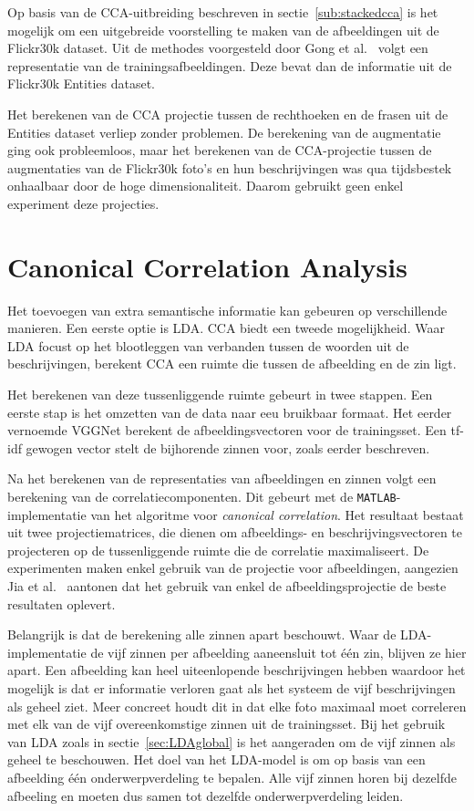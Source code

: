 Op basis van de CCA-uitbreiding beschreven in sectie~\ref{sub:stackedcca} is het mogelijk om een uitgebreide voorstelling te maken van de afbeeldingen uit de Flickr30k dataset. Uit de methodes voorgesteld door Gong et al.~\cite{Gong2014} volgt een representatie van de trainingsafbeeldingen. Deze bevat dan de informatie uit de Flickr30k Entities dataset.

Het berekenen van de CCA projectie tussen de rechthoeken en de frasen uit de Entities dataset verliep zonder problemen. De berekening van de augmentatie ging ook probleemloos, maar het berekenen van de CCA-projectie tussen de augmentaties van de Flickr30k foto's en hun beschrijvingen was qua tijdsbestek onhaalbaar door de hoge dimensionaliteit. Daarom gebruikt geen enkel experiment deze projecties. 

\section{Canonical Correlation Analysis}
Het toevoegen van extra semantische informatie kan gebeuren op verschillende manieren. Een eerste optie is LDA. CCA biedt een tweede mogelijkheid. Waar LDA focust op het blootleggen van verbanden tussen de woorden uit de beschrijvingen, berekent CCA een ruimte die tussen de afbeelding en de zin ligt.

Het berekenen van deze tussenliggende ruimte gebeurt in twee stappen. Een eerste stap is het omzetten van de data naar eeu bruikbaar formaat. Het eerder vernoemde VGGNet berekent de afbeeldingsvectoren voor de trainingsset. Een tf-idf gewogen vector stelt de bijhorende zinnen voor, zoals eerder beschreven. 

Na het berekenen van de representaties van afbeeldingen en zinnen volgt een berekening van de correlatiecomponenten. Dit gebeurt met de \texttt{MATLAB}-implementatie van het algoritme voor \emph{canonical correlation}. Het resultaat bestaat uit twee projectiematrices, die dienen om afbeeldings- en beschrijvingsvectoren te projecteren op de tussenliggende ruimte die de correlatie maximaliseert. De experimenten maken enkel gebruik van de projectie voor afbeeldingen, aangezien Jia et al.~\cite{Fernando2015} aantonen dat het gebruik van enkel de afbeeldingsprojectie de beste resultaten oplevert.

Belangrijk is dat de berekening alle zinnen apart beschouwt. Waar de LDA-implementatie de vijf zinnen per afbeelding aaneensluit tot \'e\'en zin, blijven ze hier apart. Een afbeelding kan heel uiteenlopende beschrijvingen hebben waardoor het mogelijk is dat er informatie verloren gaat als het systeem de vijf beschrijvingen als geheel ziet. Meer concreet houdt dit in dat elke foto maximaal moet correleren met elk van de vijf overeenkomstige zinnen uit de trainingsset. Bij het gebruik van LDA zoals in sectie~\ref{sec:LDAglobal} is het aangeraden om de vijf zinnen als geheel te beschouwen. Het doel van het LDA-model is om op basis van een afbeelding \'e\'en onderwerpverdeling te bepalen. Alle vijf zinnen horen bij dezelfde afbeeling en moeten dus samen tot dezelfde onderwerpverdeling leiden.

